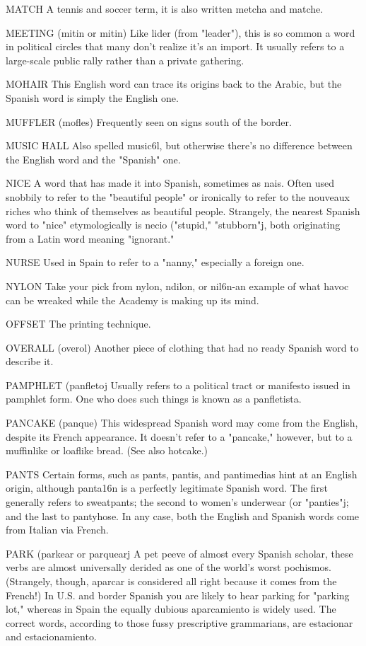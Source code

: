 MATCH A tennis and soccer term, it is also written metcha
and matche.

MEETING (mitin or mitin) Like lider (from "leader"), this is
so common a word in political circles that many don't realize it's an
import. It usually refers to a large-scale public rally rather than a private gathering.

MOHAIR This English word can trace its origins back to the
Arabic, but the Spanish word is simply the English one.

MUFFLER (mofles) Frequently seen on signs south of the
border.

MUSIC HALL Also spelled music6l, but otherwise there's no
difference between the English word and the "Spanish" one.

NICE A word that has made it into Spanish, sometimes as
nais. Often used snobbily to refer to the "beautiful people" or ironically to refer to the nouveaux riches who think of themselves as beautiful people. Strangely, the nearest Spanish word to "nice" etymologically is necio ("stupid," "stubborn"j, both originating from a Latin
word meaning "ignorant."

NURSE Used in Spain to refer to a "nanny," especially a foreign one.

NYLON Take your pick from nylon, ndilon, or nil6n-an example of what havoc can be wreaked while the Academy is making up
its mind.

OFFSET The printing technique.

OVERALL (overol) Another piece of clothing that had no
ready Spanish word to describe it.

PAMPHLET (panfletoj Usually refers to a political tract or manifesto issued in pamphlet form. One who does such things is known as
a panfletista.

PANCAKE (panque) This widespread Spanish word may come
from the English, despite its French appearance. It doesn't refer to a
"pancake," however, but to a muffinlike or loaflike bread. (See also
hotcake.)

PANTS Certain forms, such as pants, pantis, and pantimedias hint at an English origin, although panta16n is a perfectly legitimate Spanish word. The first generally refers to sweatpants; the second to women's underwear (or "panties"j; and the last to pantyhose.
In any case, both the English and Spanish words come from Italian via
French.

PARK (parkear or parquearj A pet peeve of almost every
Spanish scholar, these verbs are almost universally derided as one of
the world's worst pochismos. (Strangely, though, aparcar is considered
all right because it comes from the French!) In U.S. and border Spanish
you are likely to hear parking for "parking lot," whereas in Spain the
equally dubious aparcamiento is widely used. The correct words, according to those fussy prescriptive grammarians, are estacionar and
estacionamiento.

